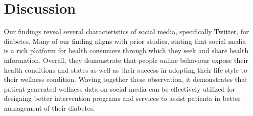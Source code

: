 \documentclass{acm_proc_article-sp}
\makeatletter
\newcommand{\tabincell}[2]{\begin{tabular}{@{}#1@{}}#2\end{tabular}}
\makeatother
\begin{document}


\section{Discussion}
Our findings reveal several characteristics of social media, specifically Twitter, for diabetes. Many of our finding aligns with prior studies, stating that social media is a rich platform for health consumers through which they seek and share health information. Overall, they demonstrate that people online behaviour expose their health conditions and states as well as their success in adopting their life style to their wellness condition. Waving together these observation, it demonstrates that patient generated wellness data on social media can be effectively utilized for designing better intervention programs and services to assist patienta in better management of their diabetes.
\end{document}
